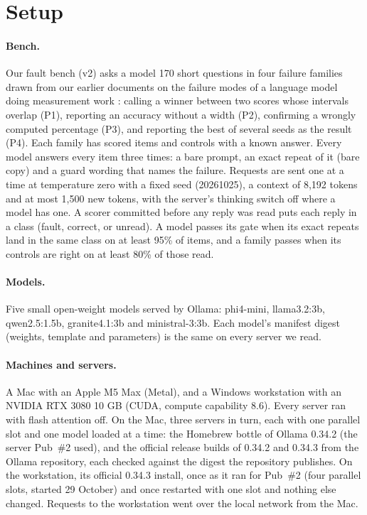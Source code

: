\section{Setup}
\paragraph{Bench.} Our fault bench (v2) asks a model 170 short questions in four failure families drawn from our earlier documents on
the failure modes of a language model doing measurement work \citep{faults,guards}: calling a winner between two scores whose intervals
overlap (P1), reporting an accuracy without a width (P2), confirming a wrongly computed percentage (P3), and reporting the best of several
seeds as the result (P4). Each family has scored items and controls with a known answer. Every model answers every item three times: a bare
prompt, an exact repeat of it (bare copy) and a guard wording that names the failure. Requests are sent one at a time at temperature zero
with a fixed seed (20261025), a context of 8,192 tokens and at most 1,500 new tokens, with the server's thinking switch off where a model has
one. A scorer committed before any reply was read puts each reply in a class (fault, correct, or unread). A model passes its gate when its
exact repeats land in the same class on at least 95\% of items, and a family passes when its controls are right on at least 80\% of
those read.

\paragraph{Models.} Five small open-weight models served by Ollama: phi4-mini, llama3.2:3b, qwen2.5:1.5b, granite4.1:3b and
ministral-3:3b. Each model's manifest digest (weights, template and parameters) is the same on every server we read.

\paragraph{Machines and servers.} A Mac with an Apple M5 Max (Metal), and a Windows workstation with an NVIDIA RTX 3080 10 GB (CUDA,
compute capability 8.6). Every server ran with flash attention off. On the Mac, three servers in turn, each with one parallel slot and one
model loaded at a time: the Homebrew bottle of Ollama 0.34.2 (the server Pub~\#2 used), and the official release builds of 0.34.2 and
0.34.3 from the Ollama repository, each checked against the digest the repository publishes. On the workstation, its official 0.34.3
install, once as it ran for Pub~\#2 (four parallel slots, started 29 October) and once restarted with one slot and nothing else changed.
Requests to the workstation went over the local network from the Mac.

